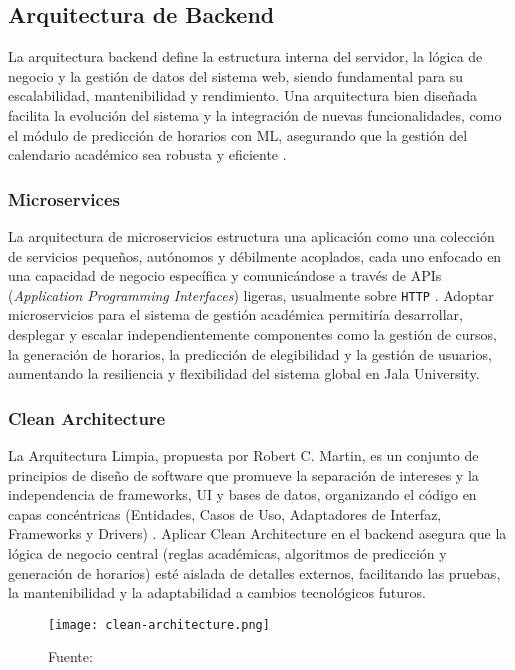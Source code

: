 \subsection{Arquitectura de Backend}
La arquitectura backend define la estructura interna del servidor, la lógica de negocio y la gestión de datos del sistema web, siendo fundamental para su escalabilidad, mantenibilidad y rendimiento.
Una arquitectura bien diseñada facilita la evolución del sistema y la integración de nuevas funcionalidades, como el módulo de predicción de horarios con ML, asegurando que la gestión del calendario académico sea robusta y eficiente \parencite{Richards2015}.

\subsubsection{Microservices}
La arquitectura de microservicios estructura una aplicación como una colección de servicios pequeños, autónomos y débilmente acoplados, cada uno enfocado en una capacidad de negocio específica y comunicándose a través de APIs (\textit{Application Programming Interfaces}) ligeras, usualmente sobre \texttt{HTTP} \parencite{Newman2015}.
Adoptar microservicios para el sistema de gestión académica permitiría desarrollar, desplegar y escalar independientemente componentes como la gestión de cursos, la generación de horarios, la predicción de elegibilidad y la gestión de usuarios, aumentando la resiliencia y flexibilidad del sistema global en Jala University.

\subsubsection{Clean Architecture}
La Arquitectura Limpia, propuesta por Robert C.
Martin, es un conjunto de principios de diseño de software que promueve la separación de intereses y la independencia de frameworks, UI y bases de datos, organizando el código en capas concéntricas (Entidades, Casos de Uso, Adaptadores de Interfaz, Frameworks y Drivers) \parencite{Martin2017}.
Aplicar Clean Architecture en el backend asegura que la lógica de negocio central (reglas académicas, algoritmos de predicción y generación de horarios) esté aislada de detalles externos, facilitando las pruebas, la mantenibilidad y la adaptabilidad a cambios tecnológicos futuros.

\begin{figure}
	\centering
	\texttt{[image: clean-architecture.png]}
	\caption{Fuente: \parencite{CleanCodeBlog}}
	\label{fig:cleanCodeBlog}
\end{figure}

